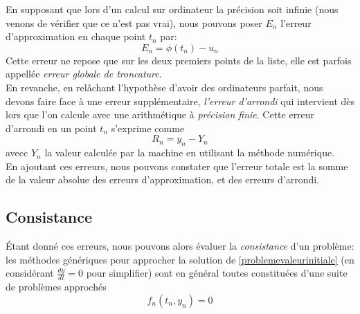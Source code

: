 \documentclass[12pt]{article}
\begin{document}
En supposant que lors d'un calcul sur ordinateur la précision soit infinie (nous venons de vérifier que ce n'est pas vrai), nous pouvons poser $E_n$ l'erreur d'approximation en chaque point $t_n$ par:
\begin{equation}
E_n = \phi(t_n) - u_n
\end{equation}
Cette erreur ne repose que sur les deux premiers points de la liste, elle est parfois appellée \emph{erreur globale de troncature}. \\
\quad En revanche, en relâchant l'hypothèse d'avoir des ordinateurs parfait, nous devons faire face à une erreur supplémentaire,  \emph{l'erreur d'arrondi} qui intervient dès lors que l'on calcule avec une arithmétique à \emph{précision finie}. Cette erreur d'arrondi en un point $t_n$ s'exprime comme
\begin{equation}
R_n = y_n - Y_n
\end{equation}
avecc $Y_n$ la valeur calculée par la machine en utilisant la méthode numérique. \\
En ajoutant ces erreurs, nous pouvons constater que l'erreur totale est la somme de la valeur absolue des erreurs d'approximation, et des erreurs d'arrondi.\\

\subsection{Consistance}
\quad Étant donné ces erreurs, nous pouvons alors évaluer la \emph{consistance} d'un problème: les méthodes génériques pour approcher la solution de \eqref{problemevaleurinitiale} (en considérant $\frac{dy}{dt} = 0$ pour simplifier) sont en général toutes constituées d'une suite de problèmes approchés
\begin{equation}
f_n(t_n, y_n) = 0
\end{equation}
\end{document}
